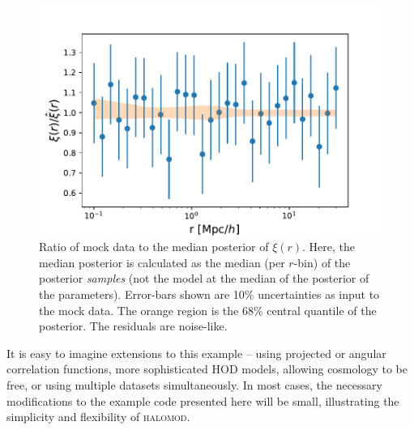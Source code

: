 \documentclass[5p,aas_macros]{elsarticle}
\newcommand{\halomod}{\textsc{halomod}}
\begin{document}
\begin{figure}
    \centering
    \includegraphics[width=\linewidth]{figures/residuals.pdf}
    \caption{Ratio of mock data to the median posterior of $\xi(r)$. Here, the median posterior is calculated as the median (per $r$-bin) of the posterior \textit{samples} (not the model at the median of the posterior of the parameters). Error-bars shown are 10\% uncertainties as input to the mock data. The orange region is the 68\% central quantile of the posterior. The residuals are noise-like.}
    \label{fig:example_resids}
\end{figure}

It is easy to imagine extensions to this example -- using projected or angular correlation functions, more sophisticated HOD models, allowing cosmology to be free, or using multiple datasets simultaneously. 
In most cases, the necessary modifications to the example code presented here will be small, illustrating the simplicity and flexibility of \halomod.



\end{document}
